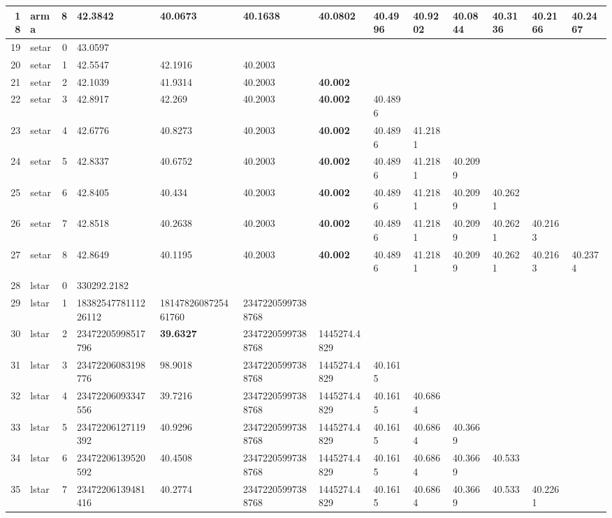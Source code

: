 \documentclass[10pt,a4paper]{article}
\begin{document}
\begin{table}[ht]
\begin{tabular}{rlrllllllllll}
  18 & arma &     8 & 42.3842 & 40.0673 & 40.1638 & 40.0802 & 40.4996 & 40.9202 & 40.0844 & 40.3136 & 40.2166 & 40.2467 \\ 
   \hline
19 & setar &     0 & 43.0597 &  &  &  &  &  &  &  &  &  \\ 
  20 & setar &     1 & 42.5547 & 42.1916 & 40.2003 &  &  &  &  &  &  &  \\ 
  21 & setar &     2 & 42.1039 & 41.9314 & 40.2003 & \textbf{40.002} &  &  &  &  &  &  \\ 
  22 & setar &     3 & 42.8917 & 42.269 & 40.2003 & \textbf{40.002} & 40.4896 &  &  &  &  &  \\ 
  23 & setar &     4 & 42.6776 & 40.8273 & 40.2003 & \textbf{40.002} & 40.4896 & 41.2181 &  &  &  &  \\ 
  24 & setar &     5 & 42.8337 & 40.6752 & 40.2003 & \textbf{40.002} & 40.4896 & 41.2181 & 40.2099 &  &  &  \\ 
  25 & setar &     6 & 42.8405 & 40.434 & 40.2003 & \textbf{40.002} & 40.4896 & 41.2181 & 40.2099 & 40.2621 &  &  \\ 
  26 & setar &     7 & 42.8518 & 40.2638 & 40.2003 & \textbf{40.002} & 40.4896 & 41.2181 & 40.2099 & 40.2621 & 40.2163 &  \\ 
  27 & setar &     8 & 42.8649 & 40.1195 & 40.2003 & \textbf{40.002} & 40.4896 & 41.2181 & 40.2099 & 40.2621 & 40.2163 & 40.2374 \\ 
   \hline
28 & lstar &     0 & 330292.2182 &  &  &  &  &  &  &  &  &  \\ 
  29 & lstar &     1 & 1838254778111226112 & 1814782608725461760 & 23472205997388768 &  &  &  &  &  &  &  \\ 
  30 & lstar &     2 & 23472205998517796 & \textbf{39.6327} & 23472205997388768 & 1445274.4829 &  &  &  &  &  &  \\ 
  31 & lstar &     3 & 23472206083198776 & 98.9018 & 23472205997388768 & 1445274.4829 & 40.1615 &  &  &  &  &  \\ 
  32 & lstar &     4 & 23472206093347556 & 39.7216 & 23472205997388768 & 1445274.4829 & 40.1615 & 40.6864 &  &  &  &  \\ 
  33 & lstar &     5 & 23472206127119392 & 40.9296 & 23472205997388768 & 1445274.4829 & 40.1615 & 40.6864 & 40.3669 &  &  &  \\ 
  34 & lstar &     6 & 23472206139520592 & 40.4508 & 23472205997388768 & 1445274.4829 & 40.1615 & 40.6864 & 40.3669 & 40.533 &  &  \\ 
  35 & lstar &     7 & 23472206139481416 & 40.2774 & 23472205997388768 & 1445274.4829 & 40.1615 & 40.6864 & 40.3669 & 40.533 & 40.2261 &  \\ 

\end{tabular}
\end{table}
\end{document}
